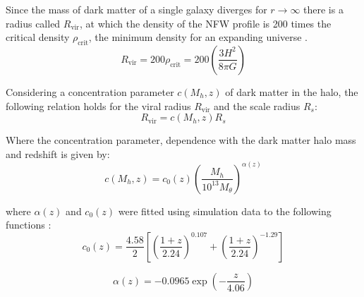 		
		Since the mass of dark matter of a single galaxy diverges for $r \rightarrow \infty$ there is a radius called $R_\text{vir}$, at which the density of the NFW profile is 200 times the critical density $\rho_\text{crit}$, the minimum density for an expanding universe .
		\begin{equation}
			R_\text{vir} = 200 \rho_\text{crit} = 200 \left(\dfrac{3H^2}{8\pi G}\right)
		\end{equation}
		
		Considering a concentration parameter $c(M_h, z)$ of dark matter in the halo, the following relation holds for the viral radius $R_\text{vir}$ and the scale radius $R_s$:
		\begin{equation}\label{eq: viralRadius}
			R_\text{vir} = c(M_h, z)R_s
		\end{equation}
		
		Where the concentration parameter, dependence with the dark matter halo mass and redshift is given by: 
		\begin{equation}
		c(M_h, z) = c_0(z)\left(\dfrac{M_h}{10^{13}M_\theta}\right)^{\alpha(z)}
		\end{equation}
		
		where $\alpha(z)$ and $c_0(z)$ were fitted using simulation data to the following functions \cite{choksi2017recoiling}:
		\begin{equation}
		c_0(z) = \dfrac{4.58}{2}\left[\left(\dfrac{1 + z}{2.24}\right)^{0.107} + \left(\dfrac{1 + z}{2.24}\right)^{-1.29}\right]
		\end{equation}
		
		\begin{equation}
		\alpha(z) = -0.0965 \exp\left(-\dfrac{z}{4.06}\right)
		\end{equation}
		
	

